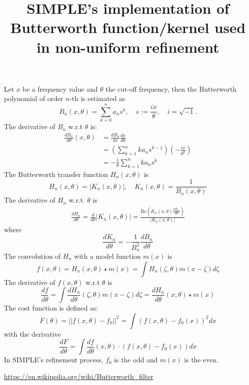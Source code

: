 \documentclass{article}
\begin{document}
\title{SIMPLE's implementation of Butterworth function/kernel used in non-uniform refinement}
\maketitle
\noindent Let $x$ be a frequency value and $\theta$ the cut-off frequency, then the Butterworth polynomial of order $n$-th is estimated \cite{ButterworthWiki} as
\begin{equation}\label{eq1}
B_n(x,\theta) = \sum_{k = 0}^n a_n s^k, \quad s := \frac{ix}{\theta}, \quad i = \sqrt{-1}.
\end{equation}
The derivative of $B_n$ w.r.t $\theta$ is:
\begin{align}
\frac{dB_n}{d\theta}(x,\theta) &= \frac{dB_n}{ds}\frac{ds}{d\theta} \\
&= \left( \sum_{k = 1}^n ka_ns^{k-1} \right) \left(-\frac{ix}{\theta^2}\right) \\
&= -\frac{1}{\theta}\sum_{k=1}^n ka_ns^k
\end{align}
The Butterworth transfer function $H_n(x,\theta)$ is
\begin{equation}\label{eq5}
H_n(x, \theta) = \left| K_n(x,\theta) \right|, \quad K_n(x, \theta) = \frac{1}{B_n(x, \theta)}
\end{equation}
The derivative of $H_n$ w.r.t. $\theta$ is
\begin{align}\label{eq6}
\frac{dH_n}{d\theta} = \frac{d}{d\theta}\left| K_n(x,\theta) \right| = \frac{\text{Re}\left(K_n(x,\theta)\overline{\frac{dK_n}{d\theta}}\right)}{\left| K_n(x,\theta) \right|}
\end{align}
where
\begin{equation}\label{eq7}
\frac{dK_n}{d\theta} = -\frac{1}{B_n^2}\frac{dB_n}{d\theta}
\end{equation}
The convolution of $H_n$ with a model function $m(x)$ is
\begin{equation}\label{eq8}
f(x,\theta) = H_n(x,\theta) \star m(x) = \int H_n(\zeta, \theta)m(x-\zeta)d\zeta
\end{equation} 
The derivative of $f(x,\theta)$ w.r.t $\theta$ is
\begin{equation}\label{eq9}
\frac{df}{d\theta} = \int\frac{dH_n}{d\theta}(\zeta,\theta)m(x-\zeta)d\zeta = \frac{dH_n}{d\theta}(x,\theta) \star m(x)
\end{equation}
The cost function is defined as:
\begin{equation}\label{eq10}
F(\theta) = ||f(x,\theta) - f_0||^2 = \int (f(x,\theta) - f_0(x))^2dx
\end{equation}
with the derivative
\begin{equation}\label{eq11}
\frac{dF}{d\theta} = \int \frac{df}{d\theta}(x,\theta) \cdot (f(x,\theta) - f_0(x))dx
\end{equation}
In SIMPLE's refinement process, $f_0$ is the odd and $m(x)$ is the even.
\begin{thebibliography}{9}
 \url{https://en.wikipedia.org/wiki/Butterworth_filter}
\end{thebibliography}
\end{document}
